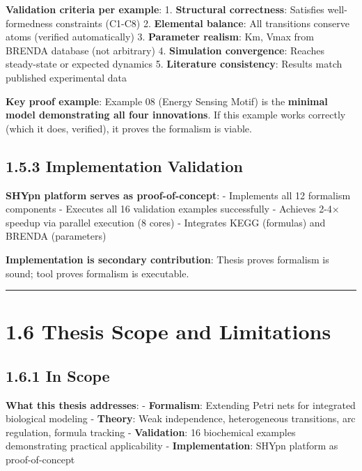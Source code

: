 \textbf{Validation criteria per example}: 1. \textbf{Structural
correctness}: Satisfies well-formedness constraints (C1-C8) 2.
\textbf{Elemental balance}: All transitions conserve atoms (verified
automatically) 3. \textbf{Parameter realism}: Km, Vmax from BRENDA
database (not arbitrary) 4. \textbf{Simulation convergence}: Reaches
steady-state or expected dynamics 5. \textbf{Literature consistency}:
Results match published experimental data

\textbf{Key proof example}: Example 08 (Energy Sensing Motif) is the
\textbf{minimal model demonstrating all four innovations}. If this
example works correctly (which it does, verified), it proves the
formalism is viable.

\hypertarget{implementation-validation}{%
\subsection{1.5.3 Implementation
Validation}\label{implementation-validation}}

\textbf{SHYpn platform serves as proof-of-concept}: - Implements all 12
formalism components - Executes all 16 validation examples successfully
- Achieves 2-4× speedup via parallel execution (8 cores) - Integrates
KEGG (formulas) and BRENDA (parameters)

\textbf{Implementation is secondary contribution}: Thesis proves
formalism is sound; tool proves formalism is executable.

\begin{center}\rule{0.5\linewidth}{0.5pt}\end{center}

\hypertarget{thesis-scope-and-limitations}{%
\section{1.6 Thesis Scope and
Limitations}\label{thesis-scope-and-limitations}}

\hypertarget{in-scope}{%
\subsection{1.6.1 In Scope}\label{in-scope}}

\textbf{What this thesis addresses}: - \textbf{Formalism}: Extending
Petri nets for integrated biological modeling - \textbf{Theory}: Weak
independence, heterogeneous transitions, arc regulation, formula
tracking - \textbf{Validation}: 16 biochemical examples demonstrating
practical applicability - \textbf{Implementation}: SHYpn platform as
proof-of-concept

